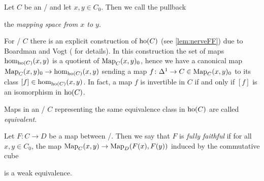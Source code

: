 \begin{definition}\label{def:mappingSpace}
    Let $C$ be an \inftycat/ and let $x,y\in C_0$. 
    Then we call the pullback 
    \begin{center}
    \end{center}
    the \emph{mapping space from $x$ to $y$}.
\end{definition}
\begin{remark}\label{rmk:boardmanVogt}
    For \inftycats/ $C$ there is an explicit construction of $\operatorname{ho}(C)$ (see \cref{lem:nerveFF}) due to Boardman and Vogt (\cite[Theorem 1.6.6]{cisinski_2019} for details).
    In this construction the set of maps $\hom_{\operatorname{ho}(C)}(x,y)$ is a quotient of $\operatorname{Map}_C(x,y)_0$, hence we have a canonical map $\operatorname{Map}_C(x,y)_0\to\hom_{\operatorname{ho}(C)}(x,y)$ sending a map $f\colon\Delta^1\to C\in\operatorname{Map}_C(x,y)_0$ to its class $[f]\in\hom_{\operatorname{ho}(C)}(x,y)$.
    In fact, a map $f$ is invertible in $C$ if and only if $[f]$ is an isomorphism in $\operatorname{ho}(C)$.

    Maps in an \inftycat/ $C$ representing the same equivalence class in $\operatorname{ho}(C)$ are called \emph{equivalent}.
\end{remark}
\begin{definition}
    Let $F\colon C\to D$ be a map between \inftycats/.
    Then we say that $F$ is \emph{fully faithful} if for all $x,y\in C_0$, the map $\operatorname{Map}_C(x,y)\to\operatorname{Map}_D(F(x),F(y))$ induced by the commutative cube
    \begin{center}
    \end{center}
    is a weak equivalence.
\end{definition}
